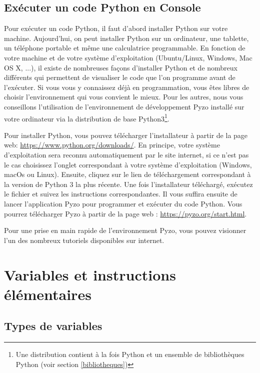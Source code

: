 \subsection{Exécuter un code Python en Console}

Pour exécuter un code Python, il faut d'abord installer Python sur votre machine. Aujourd'hui, on peut installer Python sur un ordinateur, une tablette, un téléphone portable et même une calculatrice programmable. En fonction de votre machine et de votre système d'exploitation (Ubuntu/Linux, Windows, Mac OS X, ...), il existe de nombreuses façons d'installer Python et de nombreux  différents qui permettent de visualiser le code que l'on programme avant de l'exécuter. Si vous vous y connaissez déjà en programmation, vous êtes libres de choisir l'environnement qui vous convient le mieux. Pour les autres, nous vous conseillons l'utilisation de l'environnement de développement Pyzo installé sur votre ordinateur via la distribution de base Python3\footnote{Une distribution contient à la fois Python et un ensemble de bibliothèques Python (voir section \ref{bibliotheques})}.

Pour installer Python, vous pouvez télécharger l'installateur à partir de la page web: \href{https://www.python.org/downloads/}{https://www.python.org/downloads/}. En principe, votre système d'exploitation sera reconnu automatiquement par le site internet, si ce n'est pas le cas choisissez l'onglet correspondant à votre système d'exploitation (Windows, macOs ou Linux). Ensuite, cliquez sur le lien de téléchargement correspondant à la version de Python 3 la plus récente. Une fois l'installateur téléchargé, exécutez le fichier et suivez les instructions correspondantes. Il vous suffira ensuite de lancer l'application Pyzo pour programmer et exécuter du code Python. Vous pourrez télécharger Pyzo à partir de la page web : \href{https://pyzo.org/start.html}{https://pyzo.org/start.html}.

Pour une prise en main rapide de l'environnement Pyzo, vous pouvez visionner l'un des nombreux tutoriels disponibles sur internet. 

\section{Variables et instructions élémentaires}

\subsection{Types de variables}

